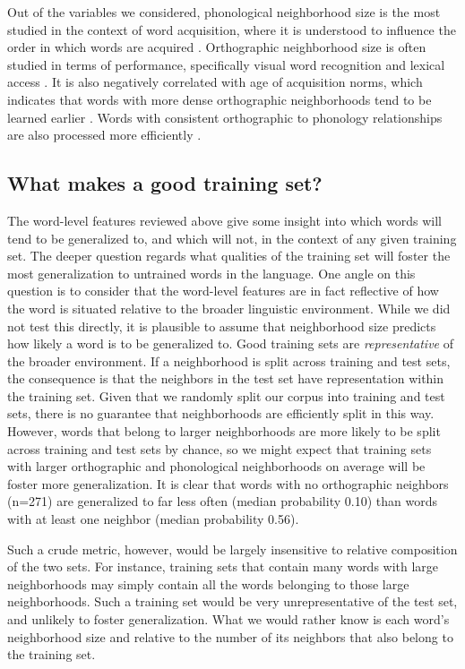 \documentclass[10pt,letterpaper]{article}
\begin{document}
Out of the variables we considered, phonological neighborhood size is the most studied in the context of word acquisition, where it is understood to influence the order in which words are acquired \cite{Storkel2003}.
Orthographic neighborhood size is often studied in terms of performance, specifically visual word recognition and lexical access \cite{Andrews1997}.
It is also negatively correlated with age of acquisition norms, which indicates that words with more dense orthographic neighborhoods tend to be learned earlier \cite{Cameirao2010}.
Words with consistent orthographic to phonology relationships are also processed more efficiently \cite{Ziegler2004}.

\subsection{What makes a good training set?}
The word-level features reviewed above give some insight into which words will tend to be generalized to, and which will not, in the context of any given training set.
The deeper question regards what qualities of the training set will foster the most generalization to untrained words in the language.
One angle on this question is to consider that the word-level features are in fact reflective of how the word is situated relative to the broader linguistic environment.
While we did not test this directly, it is plausible to assume that neighborhood size predicts how likely a word is to be generalized to.
Good training sets are \textit{representative} of the broader environment.
If a neighborhood is split across training and test sets, the consequence is that the neighbors in the test set have representation within the training set.
Given that we randomly split our corpus into training and test sets, there is no guarantee that neighborhoods are efficiently split in this way.
However, words that belong to larger neighborhoods are more likely to be split across training and test sets by chance, so we might expect that training sets with larger orthographic and phonological neighborhoods on average will be foster more generalization.
It is clear that words with no orthographic neighbors (n=271) are generalized to far less often (median probability 0.10) than words with at least one neighbor (median probability 0.56).

Such a crude metric, however, would be largely insensitive to relative composition of the two sets.
For instance, training sets that contain many words with large neighborhoods may simply contain all the words belonging to those large neighborhoods.
Such a training set would be very unrepresentative of the test set, and unlikely to foster generalization.
What we would rather know is each word's neighborhood size and relative to the number of its neighbors that also belong to the training set.
\end{document}
